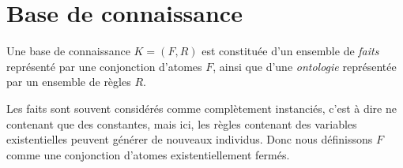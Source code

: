 
\section{Base de connaissance}\label{def_base}
Une base de connaissance $K = (F,R)$ 
est constituée d'un ensemble de {\em faits} représenté
par une conjonction d'atomes $F$, ainsi que d'une {\em ontologie} représentée 
par un ensemble de règles $R$.

Les faits sont souvent considérés comme complètement instanciés, c'est à dire ne
contenant que des constantes, mais ici, les règles contenant des variables existentielles
peuvent générer de nouveaux individus. Donc nous définissons $F$ comme une conjonction
d'atomes existentiellement fermés.




